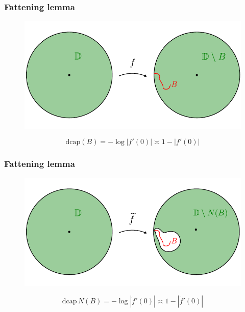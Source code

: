 \documentclass[xcolor=pdftex,dvipsnames,table]{beamer}
\newcommand{\dcap}{\text{dcap}}
\theoremstyle{definition}
\begin{document}
\begin{frame}
  \frametitle{Fattening lemma}
  \begin{figure}
    \includegraphics[scale=0.8]{figures/fattening_03.pdf}
  \end{figure}
  \[
      \dcap(B) = - \log \left| f'(0) \right| \asymp 1 - \left| f'(0) \right|
  \]  
\end{frame}

\begin{frame}
  \frametitle{Fattening lemma}
  \begin{figure}
    \includegraphics[scale=0.8]{figures/fattening_04.pdf}
  \end{figure}
  \[
      \dcap \, N(B) = - \log \left| \widetilde{f}'(0) \right| \asymp 1 - \left| \widetilde{f}'(0) \right|
  \]  
\end{frame}
\end{document}
